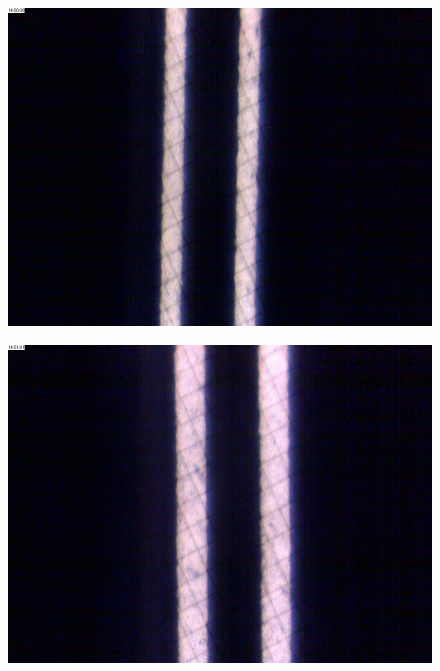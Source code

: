 \begin{figure}[htbp]
\begin{minipage}[ht]{0.48\hsize}
        \includegraphics[width=\linewidth]{src/figures/result/ds1_slit.jpg}
        \label{subfig:ds1_slit}
    \end{minipage}
    \begin{minipage}[ht]{0.48\hsize}\centering
        \includegraphics[width=\linewidth]{src/figures/result/ds2_slit.jpg}
        \label{subfig:ds2_slit}
    \end{minipage}
\end{figure}
